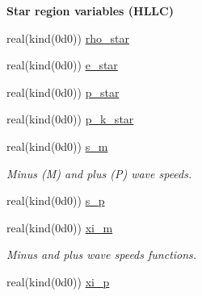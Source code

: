 \begin{Indent}\textbf{ Star region variables (H\+L\+LC)}\par
\begin{DoxyCompactItemize}
\item 
real(kind(0d0)) \hyperlink{namespacem__riemann__solvers_a6c143ed17587d6f4b1a39e1f49e030e8}{rho\+\_\+star}
\item 
real(kind(0d0)) \hyperlink{namespacem__riemann__solvers_a74301c7719264f4c4ca9ab6318a438cb}{e\+\_\+star}
\item 
real(kind(0d0)) \hyperlink{namespacem__riemann__solvers_ab48bf742ff1449dd3e044ce44cc59a56}{p\+\_\+star}
\item 
real(kind(0d0)) \hyperlink{namespacem__riemann__solvers_ac5dad78660af09505fe587f052afdfd5}{p\+\_\+k\+\_\+star}
\end{DoxyCompactItemize}
\end{Indent}
\textbf{ }\par
\begin{DoxyCompactItemize}
\item 
real(kind(0d0)) \hyperlink{namespacem__riemann__solvers_a418fedb6a95524db57eeb364db8c5c0c}{s\+\_\+m}
\begin{DoxyCompactList}\small\item\em Minus (M) and plus (P) wave speeds. \end{DoxyCompactList}\item 
real(kind(0d0)) \hyperlink{namespacem__riemann__solvers_ae941c64575d69a7b369f9f5bb921a384}{s\+\_\+p}
\end{DoxyCompactItemize}

\textbf{ }\par
\begin{DoxyCompactItemize}
\item 
real(kind(0d0)) \hyperlink{namespacem__riemann__solvers_a2da04da751b4d4e1e1d8783d80f4ebe1}{xi\+\_\+m}
\begin{DoxyCompactList}\small\item\em Minus and plus wave speeds functions. \end{DoxyCompactList}\item 
real(kind(0d0)) \hyperlink{namespacem__riemann__solvers_a549a425e9a863451e770d405f092417c}{xi\+\_\+p}
\end{DoxyCompactItemize}

